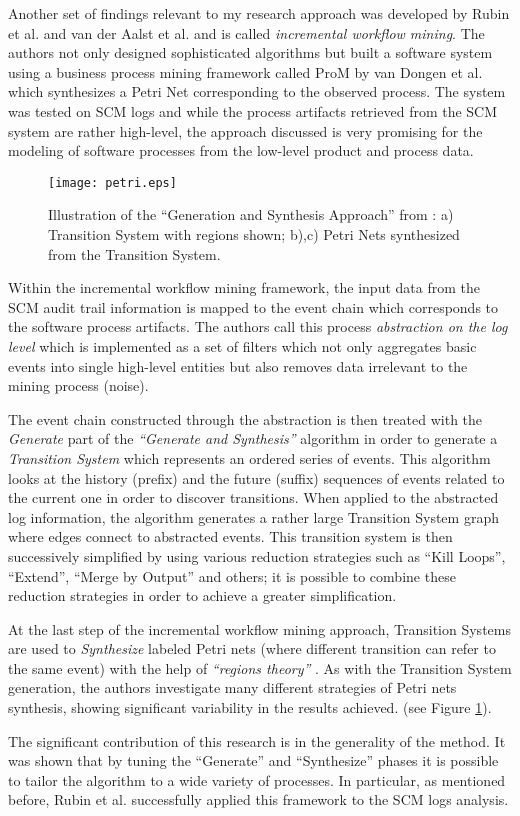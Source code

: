 Another set of findings relevant to my research approach was developed by Rubin
et al. \cite{citeulike:1885717} and van der Aalst et al.
\cite{citeulike:3718014} and is called \textit{incremental workflow mining}. The
authors not only designed sophisticated algorithms but built a software system
using a business process mining framework called ProM by van Dongen et al.
\cite{citeulike:5043673} which synthesizes a Petri Net corresponding to the
observed process. The system was tested on SCM logs and while the process
artifacts retrieved from the SCM system are rather high-level, the approach
discussed is very promising for the modeling of software processes from the
low-level product and process data.

\begin{figure}[tbp]
   \centering
   \texttt{[image: petri.eps]}
   \caption{Illustration of the ``Generation and Synthesis Approach'' from
\cite{citeulike:5043673}: a) Transition System with regions shown; b),c) Petri
Nets synthesized from the Transition System.}
   \label{fig:petri}
\end{figure}

Within the incremental workflow mining framework, the input data from the SCM
audit trail information is mapped to the event chain which corresponds to the
software process artifacts. The authors call this process \textit{abstraction on
the log level} which is implemented as a set of filters which not only
aggregates basic events into single high-level entities but also removes data
irrelevant to the mining process (noise). 

The event chain constructed through the abstraction is then treated with the
\textit{Generate} part of the \textit{``Generate and Synthesis''}
\cite{citeulike:3718014} algorithm in order to generate a \textit{Transition
System} which represents an ordered series of events. This algorithm looks at
the history (prefix) and the future (suffix) sequences of events related to the
current one in order to discover transitions.  When applied to the abstracted
log information, the algorithm generates a rather large Transition System graph
where edges connect to abstracted events. This transition system is then
successively simplified by using various reduction strategies such as ``Kill
Loops'', ``Extend'', ``Merge by Output'' and others; it is possible to combine
these reduction strategies in order to achieve a greater simplification.

At the last step of the incremental workflow mining approach, Transition Systems
are used to \textit{Synthesize} labeled Petri nets (where different transition
can refer to the same event) with the help of \textit{``regions theory''}
\cite{citeulike:5128170}. As with the Transition System generation, the authors
investigate many different strategies of Petri nets synthesis, showing
significant variability in the results achieved. (see Figure \ref{fig:petri}).

The significant contribution of this research is in the generality of the
method. It was shown that by tuning the ``Generate'' and ``Synthesize'' phases
it is possible to tailor the algorithm to a wide variety of processes. In
particular, as mentioned before, Rubin et al. successfully applied this
framework to the SCM logs analysis.
